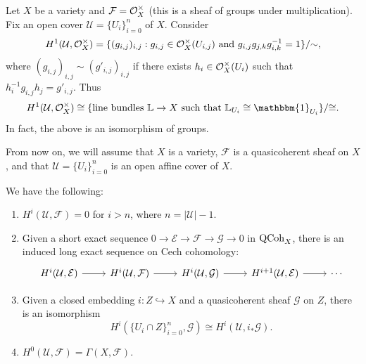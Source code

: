 \begin{example}
  Let $X$ be a variety and
  $\mathcal{F} = \mathcal{O}_X^\times$ (this is a
  sheaf of groups under multiplication). Fix an open cover
  $\mathcal{U} = \{U_i\}_{i = 0}^n$ of $X$.
  Consider
  \[
    H^1(\mathcal{U}, \mathcal{O}_X^\times)
    = \{
      (g_{i, j})_{i, j}
      : g_{i, j} \in \mathcal{O}_X^\times(U_{i, j})
      \text{ and } g_{i, j} g_{j, k} g_{i, k}^{-1} = 1
    \} / {\sim},
  \]
  where $(g_{i, j})_{i, j} \sim (g'_{i, j})_{i, j}$
  if there exists $h_i \in \mathcal{O}_X^\times(U_i)$
  such that $h_i^{-1} g_{i, j} h_j = g'_{i, j}$. Thus
  \[
    H^1(\mathcal{U}, \OO_X^\times)
    \cong \{\text{line bundles } \mathbb{L} \to X \text{ such that } \mathbb{L}_{U_i} \cong \mathbbm{1}_{U_i}\} / {\cong}.
  \]
  In fact, the above
  is an isomorphism of groups.
\end{example}

\begin{remark}
  From now on, we will assume that
  $X$ is a variety, $\mathcal{F}$
  is a quasicoherent sheaf on $X$, and that
  $\mathcal{U} = \{U_i\}_{i = 0}^n$ is an
  open affine cover of $X$.
\end{remark}

\begin{prop}
  We have the following:
  \begin{enumerate}
    \item $H^i(\mathcal{U}, \mathcal{F}) = 0$ for $i > n$, where
      $n = |\mathcal{U}| - 1$.
    \item Given a short exact sequence
      $0 \to \mathcal{E} \to \mathcal{F} \to \mathcal{G} \to 0$
      in $\operatorname{QCoh}_X$, there is an induced
      long exact sequence
      on Cech cohomology:
      \[
        \begin{tikzcd}
          H^i(\mathcal{U}, \mathcal{E}) \ar[r] & H^i(\mathcal{U}, \mathcal{F})
          \ar[r] & H^i(\mathcal{U}, \mathcal{G})
          \ar[r] & H^{i + 1}(\mathcal{U}, \mathcal{E}) \ar[r] & \cdots
        \end{tikzcd}
      \]
    \item Given a closed embedding
      $i : Z \hookrightarrow X$ and a
      quasicoherent sheaf $\mathcal{G}$ on
      $Z$, there is an isomorphism
      \[
        H^i(\{U_i \cap Z\}_{i = 0}^n, \mathcal{G})
        \cong H^i(\mathcal{U}, i_* \mathcal{G}).
      \]
    \item $H^0(\mathcal{U}, \mathcal{F}) = \Gamma(X, \mathcal{F})$.
  \end{enumerate}
\end{prop}

